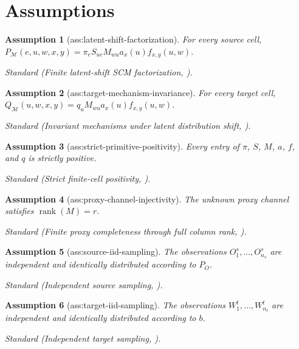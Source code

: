 \documentclass{article}
\newtheorem{assumption}{Assumption}
\begin{document}
\section{Assumptions}

\begin{assumption}[ass:latent-shift-factorization]\label{ass:latent-shift-factorization}
For every source cell, \(P_{\mathcal M}(e,u,w,x,y)=\pi_eS_{ue}M_{wu}a_x(u)f_{x,y}(u,w)\).
\par\smallskip\noindent\emph{Standard} (Finite latent-shift SCM factorization, \cite{IglesiasAlonsoEtAl2025}).
\end{assumption}

\begin{assumption}[ass:target-mechanism-invariance]\label{ass:target-mechanism-invariance}
For every target cell, \(Q_{\mathcal M}(u,w,x,y)=q_uM_{wu}a_x(u)f_{x,y}(u,w)\).
\par\smallskip\noindent\emph{Standard} (Invariant mechanisms under latent distribution shift, \cite{IglesiasAlonsoEtAl2025}).
\end{assumption}

\begin{assumption}[ass:strict-primitive-positivity]\label{ass:strict-primitive-positivity}
Every entry of \(\pi\), \(S\), \(M\), \(a\), \(f\), and \(q\) is strictly positive.
\par\smallskip\noindent\emph{Standard} (Strict finite-cell positivity, \cite{IglesiasAlonsoEtAl2025}).
\end{assumption}

\begin{assumption}[ass:proxy-channel-injectivity]\label{ass:proxy-channel-injectivity}
The unknown proxy channel satisfies \(\operatorname{rank}(M)=r\).
\par\smallskip\noindent\emph{Standard} (Finite proxy completeness through full column rank, \cite{MiaoGengTchetgen2018}).
\end{assumption}

\begin{assumption}[ass:source-iid-sampling]\label{ass:source-iid-sampling}
The observations \(O_1^s,\ldots,O_{n_s}^s\) are independent and identically distributed according to \(P_O\).
\par\smallskip\noindent\emph{Standard} (Independent source sampling, \cite{IglesiasAlonsoEtAl2025}).
\end{assumption}

\begin{assumption}[ass:target-iid-sampling]\label{ass:target-iid-sampling}
The observations \(W_1^t,\ldots,W_{n_t}^t\) are independent and identically distributed according to \(b\).
\par\smallskip\noindent\emph{Standard} (Independent target sampling, \cite{IglesiasAlonsoEtAl2025}).
\end{assumption}
\end{document}
